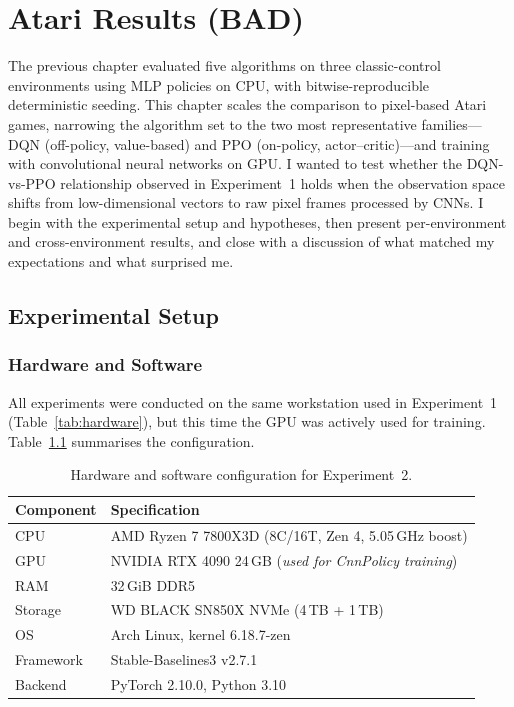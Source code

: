 

\chapter{Atari Results (BAD)}

The previous chapter evaluated five algorithms on three classic-control
environments using MLP policies on CPU, with bitwise-reproducible
deterministic seeding. This chapter scales the comparison to
pixel-based Atari games, narrowing the algorithm set to the two
most representative families---DQN (off-policy, value-based) and PPO
(on-policy, actor--critic)---and training with convolutional neural
networks on GPU. I wanted to test whether the DQN-vs-PPO
relationship observed in Experiment~1 holds when the observation space
shifts from low-dimensional vectors to raw pixel frames processed by
CNNs. I begin with the experimental setup and hypotheses, then present
per-environment and cross-environment results, and close with a
discussion of what matched my expectations and what surprised me.

\section{Experimental Setup}
\label{sec:atari-setup}

\subsection{Hardware and Software}
\label{sec:atari-hardware}

All experiments were conducted on the same workstation used in
Experiment~1 (Table~\ref{tab:hardware}), but this time the GPU was
actively used for training. Table~\ref{tab:atari-hardware} summarises
the configuration.

\begin{table}[htbp!]
\centering
\caption{Hardware and software configuration for Experiment~2.}
\label{tab:atari-hardware}
\begin{tabular}{ll}
\toprule
\textbf{Component}   & \textbf{Specification} \\
\midrule
CPU         & AMD Ryzen 7 7800X3D (8C/16T, Zen 4, 5.05\,GHz boost) \\
GPU         & NVIDIA RTX 4090 24\,GB (\emph{used for CnnPolicy training}) \\
RAM         & 32\,GiB DDR5 \\
Storage     & WD BLACK SN850X NVMe (4\,TB + 1\,TB) \\
OS          & Arch Linux, kernel 6.18.7-zen \\
Framework   & Stable-Baselines3 v2.7.1 \citep{raffin2021sb3} \\
Backend     & PyTorch 2.10.0, Python 3.10 \\
\bottomrule
\end{tabular}
\end{table}

